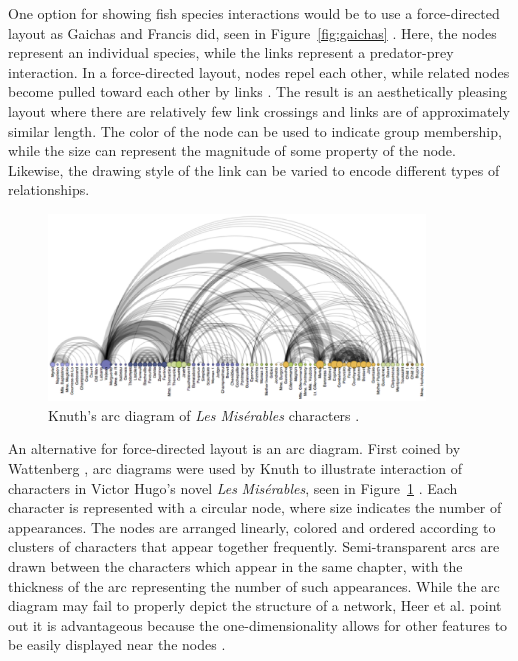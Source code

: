 One option for showing fish species interactions would be to use a force-directed layout as Gaichas and Francis did, seen in Figure~\ref{fig:gaichas} \cite{gaichas2008}.  Here, the nodes represent an individual species, while the links represent a predator-prey interaction.  In a force-directed layout, nodes repel each other, while related nodes become pulled toward each other by links \cite{heer2010}.  The result is an aesthetically pleasing layout where there are relatively few link crossings and links are of approximately similar length.  The color of the node can be used to indicate group membership, while the size can represent the magnitude of some property of the node.  Likewise, the drawing style of the link can be varied to encode different types of relationships. 

\begin{figure}[h]
	\centering
	\includegraphics[width=10cm]{figures/eps/arcdiagram.eps}
	\caption{Knuth's arc diagram of \textit{Les Mis\'erables} characters \cite{knuth1993}.}
	\label{fig:arcdiagram}
\end{figure}

An alternative for force-directed layout is an arc diagram.  First coined by Wattenberg \cite{wattenberg2002}, arc diagrams were used by Knuth to illustrate interaction of characters in Victor Hugo's novel \textit{Les} \textit{Mis\'erables}, seen in Figure~\ref{fig:arcdiagram} \cite{knuth1993}.  Each character is represented with a circular node, where size indicates the number of appearances.  The nodes are arranged linearly, colored and ordered according to clusters of characters that appear together frequently.  Semi-transparent arcs are drawn between the characters which appear in the same chapter, with the thickness of the arc representing the number of such appearances.  While the arc diagram may fail to properly depict the structure of a network, Heer et al. point out it is advantageous because the one-dimensionality allows for other features to be easily displayed near the nodes \cite{heer2010}.  %

